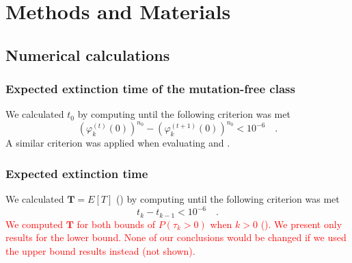 \documentclass[9pt,lineno]{elife}
\newcommand{\red}{\textcolor{red}}
\begin{document}
%
%
%
%






\section{Methods and Materials}




\subsection{Numerical calculations}

\subsubsection{Expected extinction time of the mutation-free class}
We calculated $t_0$ by computing  until the following criterion was met 
%
\begin{equation*}
\left(\varphi_{k}^{(t)}(0)\right)^{n_{0}} - \left(\varphi_{k}^{(t+1)}(0)\right)^{n_{0}} < 10^{-6} \quad .
\end{equation*}
%
A similar criterion was applied when evaluating  and . 

\subsubsection{Expected extinction time}
We calculated $\mathbf{T}=E[T]$ () by computing  until the following criterion was met 
%
\begin{equation*}
t_k - t_{k-1} < 10^{-6} \quad .
\end{equation*}
%
\red{We computed $\mathbf{T}$ for both bounds of $P(\tau_{k} > 0)$ when $k>0$ ().  We present only results for the lower bound.  None of our conclusions would be changed if we used the upper bound results instead (not shown).}
\end{document}
